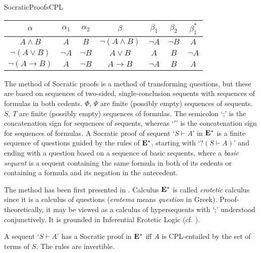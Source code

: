 \begin{entry}{SocraticProofsCPL}
\begin{calculus}
\begin{center}
	\begin{tabular}{ccc|cccc}
			\hline 
		$\alpha$ & $\alpha_{1}$ & $\alpha_{2}$ & $\beta$ & $\beta_{1}$ & $\beta_{2}$ & $\beta^{*}_{1}$  \\ 
			\hline
		$\textit{A}\wedge B$ & $\textit{A}$ & $\textit{B}$ & $\neg(A\wedge B)$ & $\neg A$ & $\neg B$ & $A$ \\
			
		$\neg(A\vee B)$ & $\neg A$ & $\neg B$ & $\textit{A}\vee B$ & $\textit{A}$ & $\textit{B}$ & $\neg A$ \\
			
		$\neg(A \rightarrow B)$ & $\textit{A}$ & $\neg B$ & $\textit{A} \rightarrow B$ & $\neg A$ & $\textit{B}$ & $A$ \\
	\end{tabular}
\end{center}

\end{calculus}

\begin{clarifications}
The method of Socratic proofs is a method of transforming questions, but these are based on sequences of two-sided, single-conclusion sequents with sequences of formulas in both cedents. $\Phi$, $\Psi$ are finite (possibly empty) sequences of sequents. $S$, $T$ are finite (possibly empty) sequences of formulas. The semicolon `;' is the concatenation sign for sequences of sequents, whereas `$'$' is the concatenation sign for sequences of formulas. A Socratic proof of sequent `$S \vdash A$' in $\mathbf{E}^*$ is a finite sequence of questions guided by the rules of $\mathbf{E}^*$, starting with `$? (S \vdash A)$' and ending with a question based on a sequence of basic sequents, where a \textit{basic sequent} is a sequent containing the same formula in both of its cedents or containing a formula and its negation in the antecedent.
\end{clarifications}

\begin{history}
The method has been first presented in \cite{AW:2004}. Calculus $\mathbf{E}^*$ is called \textit{erotetic} calculus since it is a calculus of questions (\textit{erotema} means \textit{question} in Greek). Proof-theoretically, it may be viewed as a calculus of hypersequents with `;' understood conjunctively. It is grounded in Inferential Erotetic Logic (cf. \cite{AW:2013}).
\end{history}

\begin{technicalities}
A sequent `$S \vdash A$' has a Socratic proof in $\mathbf{E}^*$ iff $A$ is CPL-entailed by the set of terms of $S$. The rules are invertible.
\end{technicalities}












\end{entry}
